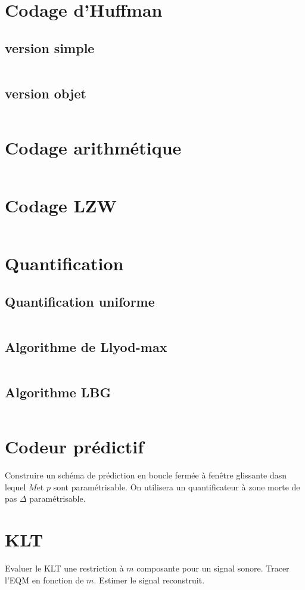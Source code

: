 \documentclass[main.tex]{subfiles}
\begin{document}
\section{Codage d'Huffman}
\subsection{version simple}
\inputminted{python}{../algo_code/huffman.py}
\subsection{version objet}
\inputminted{python}{../algo_code/huffman2.py}
\newpage
\section{Codage arithmétique}
\inputminted{python}{../algo_code/code_arithmetique.py}
\newpage
\section{Codage LZW}
\inputminted{python}{../algo_code/LZW.py}
\section{Quantification}
\subsection{Quantification uniforme}
\inputminted{python}{../algo_code/quantif.py}
\newpage
\subsection{Algorithme de Llyod-max}
\inputminted{python}{../algo_code/llyod_max.py}
\newpage
\subsection{Algorithme LBG}
\inputminted{python}{../algo_code/LBG.py}


\section{Codeur prédictif}
Construire un schéma de prédiction en boucle fermée à fenêtre glissante dasn lequel $M$et  $p$ sont paramétrisable. On utilisera un quantificateur à zone morte de pas $\Delta$ paramétrisable.
\section{KLT}
Evaluer le KLT une restriction à $m$ composante pour un signal sonore. Tracer l'EQM en fonction de $m$. Estimer le signal reconstruit.
\end{document}
